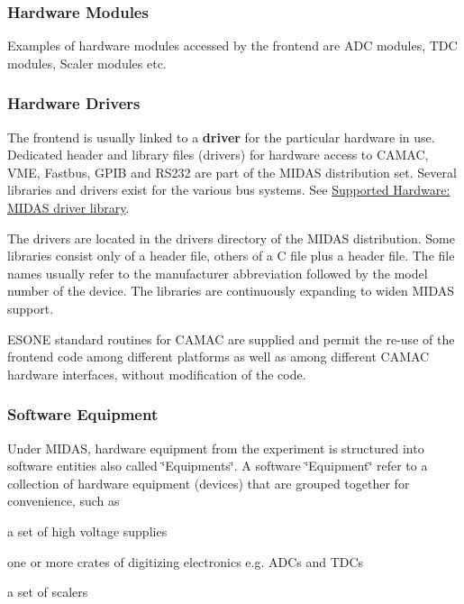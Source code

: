 \label{FrontendOperation_idx_hardware}
\hypertarget{FrontendOperation_idx_hardware}{}
 \hypertarget{FrontendOperation_FE_hw_equipment}{}\subsubsection{Hardware Modules}\label{FrontendOperation_FE_hw_equipment}
Examples of hardware modules accessed by the frontend are ADC modules, TDC modules, Scaler modules etc.

\label{FrontendOperation_idx_hardware_drivers}
\hypertarget{FrontendOperation_idx_hardware_drivers}{}
 \hypertarget{FrontendOperation_FE_drivers}{}\subsubsection{Hardware Drivers}\label{FrontendOperation_FE_drivers}
The frontend is usually linked to a {\bfseries driver} for the particular hardware in use. Dedicated header and library files (drivers) for hardware access to CAMAC, VME, Fastbus, GPIB and RS232 are part of the MIDAS distribution set. Several libraries and drivers exist for the various bus systems. See \hyperlink{FE_Hardware}{Supported Hardware: MIDAS driver library}.

The drivers are located in the drivers directory of the MIDAS distribution. Some libraries consist only of a header file, others of a C file plus a header file. The file names usually refer to the manufacturer abbreviation followed by the model number of the device. The libraries are continuously expanding to widen MIDAS support.

ESONE standard routines for CAMAC are supplied and permit the re-\/use of the frontend code among different platforms as well as among different CAMAC hardware interfaces, without modification of the code.

\label{FrontendOperation_idx_Equipment_software}
\hypertarget{FrontendOperation_idx_Equipment_software}{}
 \hypertarget{FrontendOperation_FE_sw_equipment}{}\subsubsection{Software Equipment}\label{FrontendOperation_FE_sw_equipment}
Under MIDAS, hardware equipment from the experiment is structured into software entities also called \char`\"{}Equipments\char`\"{}. A software \char`\"{}Equipment\char`\"{} refer to a collection of hardware equipment (devices) that are grouped together for convenience, such as
\begin{DoxyItemize}
\item a set of high voltage supplies
\item one or more crates of digitizing electronics e.g. ADCs and TDCs
\item a set of scalers \label{FrontendOperation_idx_Equipment}
\hypertarget{FrontendOperation_idx_Equipment}{}
 \label{FrontendOperation_Equipment_definition}
\hypertarget{FrontendOperation_Equipment_definition}{}

\end{DoxyItemize}

